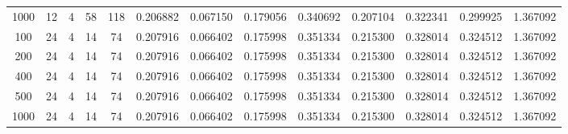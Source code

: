 \begin{table}[h]
\begin{tabular}{ccccccccccccc}
1000 & 12 & 4 & 58 & 118 & 0.206882 & 0.067150 & 0.179056 & 0.340692 & 0.207104 & 0.322341 & 0.299925 & 1.367092 \\
100 & 24 & 4 & 14 & 74 & 0.207916 & 0.066402 & 0.175998 & 0.351334 & 0.215300 & 0.328014 & 0.324512 & 1.367092 \\
200 & 24 & 4 & 14 & 74 & 0.207916 & 0.066402 & 0.175998 & 0.351334 & 0.215300 & 0.328014 & 0.324512 & 1.367092 \\
400 & 24 & 4 & 14 & 74 & 0.207916 & 0.066402 & 0.175998 & 0.351334 & 0.215300 & 0.328014 & 0.324512 & 1.367092 \\
500 & 24 & 4 & 14 & 74 & 0.207916 & 0.066402 & 0.175998 & 0.351334 & 0.215300 & 0.328014 & 0.324512 & 1.367092 \\
1000 & 24 & 4 & 14 & 74 & 0.207916 & 0.066402 & 0.175998 & 0.351334 & 0.215300 & 0.328014 & 0.324512 & 1.367092 \\
\bottomrule
\end{tabular}
\end{table}
